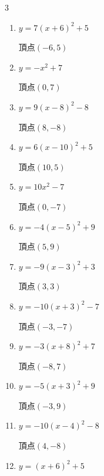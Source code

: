 \begin{multicols}{3}
\begin{enumerate}
  \item $\displaystyle y=7\left( x+6\right)^{2}+5$

        $\displaystyle 頂点\left( -6 , 5 \right)$

  \item $\displaystyle y=-x^{2}+7$

        $\displaystyle 頂点\left( 0 , 7 \right)$

  \item $\displaystyle y=9\left( x-8\right)^{2}-8$

        $\displaystyle 頂点\left( 8 , -8 \right)$

\columnbreak %

  \item $\displaystyle y=6\left( x-10\right)^{2}+5$

        $\displaystyle 頂点\left( 10 , 5 \right)$

  \item $\displaystyle y=10x^{2}-7$

        $\displaystyle 頂点\left( 0 , -7 \right)$

  \item $\displaystyle y=-4\left( x-5\right)^{2}+9$

        $\displaystyle 頂点\left( 5 , 9 \right)$

  \item $\displaystyle y=-9\left( x-3\right)^{2}+3$

        $\displaystyle 頂点\left( 3 , 3 \right)$

  \item $\displaystyle y=-10\left( x+3\right)^{2}-7$

        $\displaystyle 頂点\left( -3 , -7 \right)$

  \item $\displaystyle y=-3\left( x+8\right)^{2}+7$

        $\displaystyle 頂点\left( -8 , 7 \right)$

  \item $\displaystyle y=-5\left( x+3\right)^{2}+9$

        $\displaystyle 頂点\left( -3 , 9 \right)$

  \item $\displaystyle y=-10\left( x-4\right)^{2}-8$

        $\displaystyle 頂点\left( 4 , -8 \right)$

  \item $\displaystyle y=\left( x+6\right)^{2}+5$


\end{enumerate}
\end{multicols}
